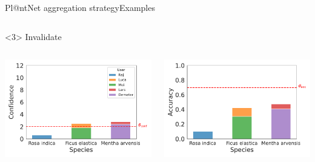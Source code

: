 \begin{frame}{Pl@ntNet aggregation strategy}{Examples}
\begin{onlyenv}
\begin{columns}
\begin{column}{.5\textwidth}
\begin{center}
                \end{center}
            \end{column}
        \end{columns}
    \end{onlyenv}
    \begin{onlyenv}<3>
        Invalidate\phantom{g}
        \begin{columns}
            \begin{column}{.5\textwidth}
                \begin{center}
                    \includegraphics[width=\textwidth]{./images/histplot_conf_invalidate.pdf}
                \end{center}
            \end{column}
            \begin{column}{.5\textwidth}
                \begin{center}
                    \includegraphics[width=\textwidth]{./images/histplot_acc_invalidate.pdf}
                \end{center}
            \end{column}
        \end{columns}
    \end{onlyenv}
\end{frame}

